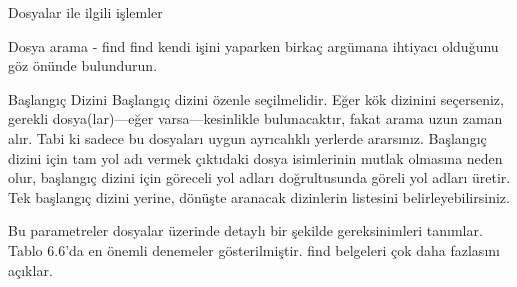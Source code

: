 \begin{section}{Dosyalar ile ilgili işlemler}
\begin{subsection}{Dosya arama - find}
find kendi işini yaparken birkaç argümana ihtiyacı olduğunu göz önünde bulundurun.

Başlangıç Dizini	Başlangıç dizini özenle seçilmelidir. Eğer kök dizinini seçerseniz, gerekli dosya(lar)—eğer varsa—kesinlikle bulunacaktır, fakat arama uzun zaman alır. Tabi ki sadece bu dosyaları uygun ayrıcalıklı yerlerde ararsınız.
Başlangıç dizini için tam yol adı vermek çıktıdaki dosya isimlerinin mutlak olmasına neden olur, başlangıç dizini için göreceli yol adları doğrultusunda göreli yol adları üretir. Tek başlangıç dizini yerine, dönüşte aranacak dizinlerin listesini belirleyebilirsiniz.

Bu parametreler dosyalar üzerinde detaylı bir şekilde gereksinimleri tanımlar. Tablo 6.6'da en önemli denemeler gösterilmiştir. find belgeleri çok daha fazlasını açıklar.


\end{subsection}
\end{section}
